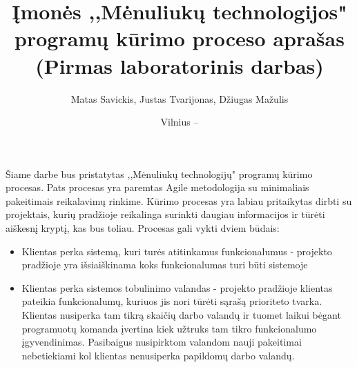 \documentclass{VUMIFPSkursinis}
\title{Įmonės ,,Mėnuliukų technologijos" programų kūrimo proceso aprašas (Pirmas laboratorinis darbas)}
\author{Matas Savickis, Justas Tvarijonas, Džiugas Mažulis}
\date{Vilnius – \the\year}
\begin{document}
\maketitle

\tableofcontents

	Šiame darbe bus pristatytas ,,Mėnuliukų technologijų" programų kūrimo procesas.
	Pats procesas yra paremtas Agile metodologija su minimaliais pakeitimais reikalavimų rinkime.
	Kūrimo procesas yra labiau pritaikytas dirbti su projektais, kurių pradžioje reikalinga surinkti daugiau informacijos ir tūrėti aiškesnį kryptį, kas bus toliau. Procesas gali vykti dviem būdais:
	\begin{itemize}
		\item{Klientas perka sistemą, kuri turės atitinkamus funkcionalumus - projekto pradžioje yra išsiaiškinama koks funkcionalumas turi būti sistemoje}
		\item{
			Klientas perka sistemos tobulinimo valandas - projekto pradžioje klientas pateikia funkcionalumų, kuriuos jis nori tūrėti sąrašą prioriteto tvarka.
			Klientas nusiperka tam tikrą skaičių darbo valandų ir tuomet laikui bėgant programuotų komanda įvertina kiek užtruks tam tikro funkcionalumo įgyvendinimas.
			Pasibaigus nusipirktom valandom nauji pakeitimai nebetiekiami kol klientas nenusiperka papildomų darbo valandų.
		}
\end{itemize}
\end{document}
